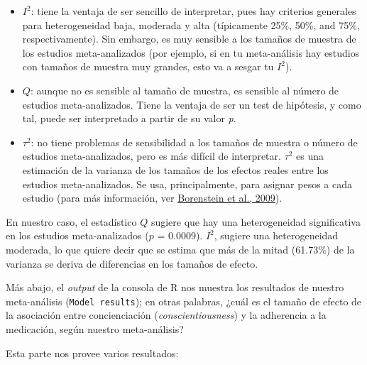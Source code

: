 \documentclass[
  bookmarksnumbered]{article}
\begin{document}
\begin{itemize}
\item
  \(I^2\): tiene la ventaja de ser sencillo de interpretar, pues hay criterios generales para heterogeneidad baja, moderada y alta (típicamente 25\%, 50\%, and 75\%, respectivamente). Sin embargo, es muy sensible a los tamaños de muestra de los estudios meta-analizados (por ejemplo, si en tu meta-análisis hay estudios con tamaños de muestra muy grandes, esto va a sesgar tu \(I^2\)).
\item
  \(Q\): aunque no es sensible al tamaño de muestra, es sensible al número de estudios meta-analizados. Tiene la ventaja de ser un test de hipótesis, y como tal, puede ser interpretado a partir de su valor \emph{p}.
\item
  \(\tau^2\): no tiene problemas de sensibilidad a los tamaños de muestra o número de estudios meta-analizados, pero es más difícil de interpretar. \(\tau^2\) es una estimación de la varianza de los tamaños de los efectos reales entre los estudios meta-analizados. Se usa, principalmente, para asignar pesos a cada estudio (para más información, ver \protect\hyperlink{ref-borensteinIdentifyingQuantifyingHeterogeneity2009}{Borenstein et al., 2009}).
\end{itemize}

En nuestro caso, el estadístico \(Q\) sugiere que hay una heterogeneidad significativa en los estudios meta-analizados (\(p\) = 0.0009). \(I^2\), sugiere una heterogeneidad moderada, lo que quiere decir que se estima que más de la mitad (61.73\%) de la varianza se deriva de diferencias en los tamaños de efecto.

Más abajo, el \emph{output} de la consola de R nos muestra los resultados de nuestro meta-análisis (\texttt{Model\ results}); en otras palabras, ¿cuál es el tamaño de efecto de la asociación entre concienciación (\emph{conscientiousness}) y la adherencia a la medicación, según nuestro meta-análisis?

Esta parte nos provee varios resultados:
\end{document}
